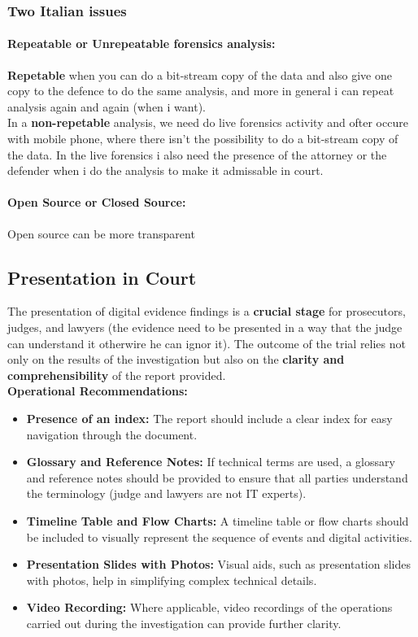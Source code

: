 \subsubsection{Two Italian issues}

\paragraph{Repeatable or Unrepeatable forensics analysis: }
\textbf{Repetable} when you can do a bit-stream copy of the data and also give one copy to the defence to do the same analysis, and more in general i can repeat analysis again and again (when i want). \\ In a \textbf{non-repetable} analysis, we need do live forensics activity and ofter occure with mobile phone, where there isn't the possibility to do a bit-stream copy of the data. In the live forensics i also need the presence of the attorney or the defender when i do the analysis to make it admissable in court.

\paragraph{Open Source or Closed Source:} %
Open source can be more transparent 

\subsection{Presentation in Court}

The presentation of digital evidence findings is a \textbf{crucial stage} for prosecutors, judges, and lawyers (the evidence need to be presented in a way that the judge can understand it otherwire he can ignor it). The outcome of the trial relies not only on the results of the investigation but also on the \textbf{clarity and comprehensibility} of the report provided. \\

\textbf{Operational Recommendations:}
\begin{itemize}
    \item \textbf{Presence of an index:} The report should include a clear index for easy navigation through the document.
    \item \textbf{Glossary and Reference Notes:} If technical terms are used, a glossary and reference notes should be provided to ensure that all parties understand the terminology (judge and lawyers are not IT experts).
    \item \textbf{Timeline Table and Flow Charts:} A timeline table or flow charts should be included to visually represent the sequence of events and digital activities.
    \item \textbf{Presentation Slides with Photos:} Visual aids, such as presentation slides with photos, help in simplifying complex technical details.
    \item \textbf{Video Recording:} Where applicable, video recordings of the operations carried out during the investigation can provide further clarity.
\end{itemize}

